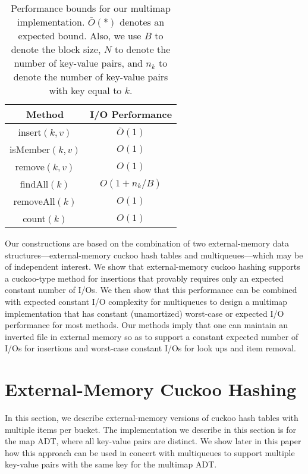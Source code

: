 \documentclass[11pt,letterpaper]{article}
\begin{document}
\begin{table}[hbt]
\begin{center}
\begin{tabular}{|c|c|}
\hline
\textbf{Method} & \textbf{I/O Performance} \\
\hline
\rule[-8pt]{0pt}{22pt} insert$(k,v)$ & $\bar O(1)$ \\
\hline
\rule[-8pt]{0pt}{22pt} isMember$(k,v)$ & $O(1)$ \\
\hline
\rule[-8pt]{0pt}{22pt} remove$(k,v)$ & $O(1)$ \\
\hline
\rule[-8pt]{0pt}{22pt} findAll$(k)$ & $O(1+n_k/B)$ \\
\hline
\rule[-8pt]{0pt}{22pt} removeAll$(k)$ & $O(1)$ \\
\hline
\rule[-8pt]{0pt}{22pt} count$(k)$ & $O(1)$ \\
\hline
\end{tabular}
\end{center}
\caption{\label{tbl:bounds} Performance bounds for our multimap
implementation. $\bar O(*)$ denotes an expected bound.
Also, we use
$B$ to denote the block size, $N$ to denote the number of key-value
pairs, 
and
$n_k$ to denote the number of key-value pairs with key equal to $k$. 
}
\end{table}

Our constructions are based on the combination of two 
external-memory data structures---external-memory cuckoo hash tables
and multiqueues---which may be of independent interest.
We show that external-memory cuckoo hashing supports
a cuckoo-type method for insertions that provably requires only an expected constant number
of I/Os. We then show that this performance can be combined with
expected constant I/O complexity for multiqueues to design a multimap
implementation that has constant (unamortized) worst-case or expected
I/O performance for most methods.
Our methods imply that one can maintain an inverted file in
external memory so as to support a constant 
expected number of I/Os for
insertions and worst-case constant I/Os for look ups and
item removal.


\section{External-Memory Cuckoo Hashing}
\label{sec:map}
In this section, we describe external-memory
versions of cuckoo hash tables with multiple items per bucket.  
The implementation we describe in this section is for the map ADT,
where all key-value pairs are distinct. We show later in this paper
how this approach can be used in concert with multiqueues to support
multiple key-value pairs with the same key for the multimap ADT.
\end{document}
